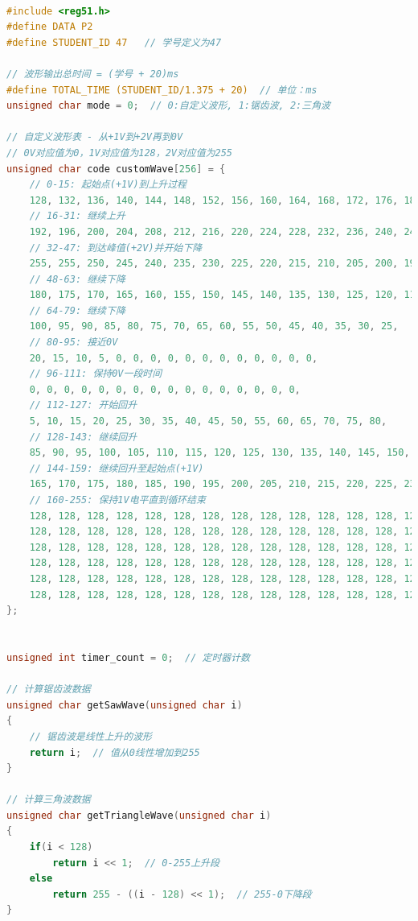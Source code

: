 \documentclass[12pt,hyperref,a4paper,UTF8]{ctexart}
\begin{document}
\begin{lstlisting}[language=C, caption={实验程序}]

#include <reg51.h>
#define DATA P2
#define STUDENT_ID 47   // 学号定义为47

// 波形输出总时间 = (学号 + 20)ms
#define TOTAL_TIME (STUDENT_ID/1.375 + 20)  // 单位：ms
unsigned char mode = 0;  // 0:自定义波形, 1:锯齿波, 2:三角波

// 自定义波形表 - 从+1V到+2V再到0V
// 0V对应值为0，1V对应值为128，2V对应值为255
unsigned char code customWave[256] = {
    // 0-15: 起始点(+1V)到上升过程
    128, 132, 136, 140, 144, 148, 152, 156, 160, 164, 168, 172, 176, 180, 184, 188,
    // 16-31: 继续上升
    192, 196, 200, 204, 208, 212, 216, 220, 224, 228, 232, 236, 240, 244, 248, 252,
    // 32-47: 到达峰值(+2V)并开始下降
    255, 255, 250, 245, 240, 235, 230, 225, 220, 215, 210, 205, 200, 195, 190, 185,
    // 48-63: 继续下降
    180, 175, 170, 165, 160, 155, 150, 145, 140, 135, 130, 125, 120, 115, 110, 105,
    // 64-79: 继续下降
    100, 95, 90, 85, 80, 75, 70, 65, 60, 55, 50, 45, 40, 35, 30, 25,
    // 80-95: 接近0V
    20, 15, 10, 5, 0, 0, 0, 0, 0, 0, 0, 0, 0, 0, 0, 0,
    // 96-111: 保持0V一段时间
    0, 0, 0, 0, 0, 0, 0, 0, 0, 0, 0, 0, 0, 0, 0, 0,
    // 112-127: 开始回升
    5, 10, 15, 20, 25, 30, 35, 40, 45, 50, 55, 60, 65, 70, 75, 80,
    // 128-143: 继续回升
    85, 90, 95, 100, 105, 110, 115, 120, 125, 130, 135, 140, 145, 150, 155, 160,
    // 144-159: 继续回升至起始点(+1V)
    165, 170, 175, 180, 185, 190, 195, 200, 205, 210, 215, 220, 225, 230, 235, 240,
    // 160-255: 保持1V电平直到循环结束
    128, 128, 128, 128, 128, 128, 128, 128, 128, 128, 128, 128, 128, 128, 128, 128,
    128, 128, 128, 128, 128, 128, 128, 128, 128, 128, 128, 128, 128, 128, 128, 128,
    128, 128, 128, 128, 128, 128, 128, 128, 128, 128, 128, 128, 128, 128, 128, 128,
    128, 128, 128, 128, 128, 128, 128, 128, 128, 128, 128, 128, 128, 128, 128, 128,
    128, 128, 128, 128, 128, 128, 128, 128, 128, 128, 128, 128, 128, 128, 128, 128,
    128, 128, 128, 128, 128, 128, 128, 128, 128, 128, 128, 128, 128, 128, 128, 128
};


unsigned int timer_count = 0;  // 定时器计数

// 计算锯齿波数据
unsigned char getSawWave(unsigned char i)
{
    // 锯齿波是线性上升的波形
    return i;  // 值从0线性增加到255
}

// 计算三角波数据
unsigned char getTriangleWave(unsigned char i)
{
    if(i < 128)
        return i << 1;  // 0-255上升段
    else
        return 255 - ((i - 128) << 1);  // 255-0下降段
}


\end{lstlisting}
\end{document}
